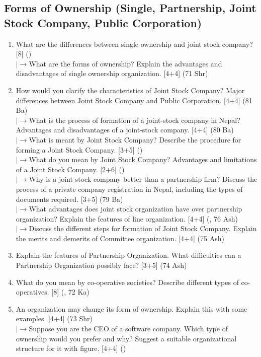 \documentclass[12pt]{article}
\newcommand{\lb}{\\$\left|\rightarrow\right.$}
\begin{document}
  \subsection{Forms of Ownership (Single, Partnership, Joint Stock Company, Public Corporation)}
    \begin{enumerate}[topsep=0pt, noitemsep]
      \item What are the differences between single ownership and joint stock company? \hfill [8] ()
        \lb What are the forms of ownership? Explain the advantages and disadvantages of single ownership organization. \hfill [4+4] (71 Shr)

      \item How would you clarify the characteristics of Joint Stock Company? Major differences between Joint Stock Company and Public Corporation. \hfill [4+4] (81 Ba)
        \lb What is the process of formation of a joint-stock company in Nepal? Advantages and disadvantages of a joint-stock company. \hfill [4+4] (80 Ba)
        \lb What is meant by Joint Stock Company? Describe the procedure for forming a Joint Stock Company. \hfill [3+5] ()
        \lb What do you mean by Joint Stock Company? Advantages and limitations of a Joint Stock Company. \hfill [2+6] ()
        \lb Why is a joint stock company better than a partnership firm? Discuss the process of a private company registration in Nepal, including the types of documents required. \hfill [3+5] (79 Ba)
        \lb What advantages does joint stock organization have over partnership organization? Explain the features of line organization. \hfill [4+4] (, 76 Ash)
        \lb Discuss the different steps for formation of Joint Stock Company. Explain the merits and demerits of Committee organization. \hfill [4+4] (75 Ash)

      \item Explain the features of Partnership Organization. What difficulties can a Partnership Organization possibly face? \hfill [3+5] (74 Ash)

      \item What do you mean by co-operative societies? Describe different types of co-operatives. \hfill [8] (, 72 Ka)

      \item An organization may change its form of ownership. Explain this with some examples. \hfill [4+4] (73 Shr)
        \lb Suppose you are the CEO of a software company. Which type of ownership would you prefer and why? Suggest a suitable organizational structure for it with figure. \hfill [4+4] ()
    \end{enumerate}
\end{document}

